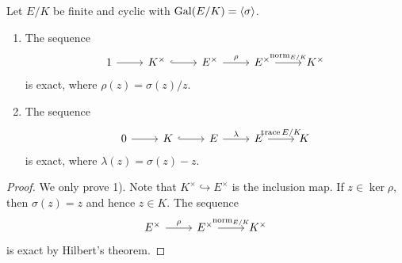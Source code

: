 \begin{corollary}
Let $E/K$ be finite and cyclic with $\operatorname{Gal}(E/K)=\langle\sigma\rangle$. 
\begin{enumerate}
    \item The sequence 
    \[\begin{tikzcd}
	1 & {K^{\times}} & {E^{\times}} & {E^{\times}} & {K^{\times}}
	\arrow[from=1-1, to=1-2]
	\arrow[hook, from=1-2, to=1-3]
	\arrow["\rho", from=1-3, to=1-4]
	\arrow["{\norm_{E/K}}", from=1-4, to=1-5]
    \end{tikzcd}\]
    is exact, where $\rho(z)=\sigma(z)/z$. 
     \item The sequence 
    \[\begin{tikzcd}
	0 & {K} & {E} & {E} & {K}
	\arrow[from=1-1, to=1-2]
	\arrow[hook, from=1-2, to=1-3]
	\arrow["\lambda", from=1-3, to=1-4]
	\arrow["{\trace{E/K}}", from=1-4, to=1-5]
    \end{tikzcd}\]
    is exact, where $\lambda(z)=\sigma(z)-z$. 
\end{enumerate}
\end{corollary}

\begin{proof}
    We only prove 1). Note that 
    $K^{\times}\hookrightarrow E^{\times}$ is the inclusion map. If 
    $z\in\ker\rho$, then $\sigma(z)=z$ and hence $z\in K$. The 
    sequence 
    \[\begin{tikzcd}
	{E^{\times}} & {E^{\times}} & {K^{\times}}
	\arrow["\rho", from=1-1, to=1-2]
	\arrow["{\norm_{E/K}}", from=1-2, to=1-3]
    \end{tikzcd}\]
    is exact by Hilbert's theorem. 
\end{proof}

